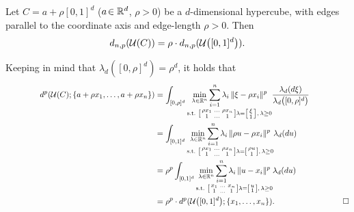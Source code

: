 \begin{prop}\label{prop:scaleProp}
Let $C= a+\rho [0,1]^d$ ($a\!\in \mathbb{R}^d$, $\rho>0$) be a $d$-dimensional hypercube, with edges parallel to the coordinate axis and edge-length $\rho > 0$. Then
\[
	d_{n,p}(\mathcal{U}(C)) = \rho \cdot d_{n,p}(\mathcal{U}\bigl([0,1]^d\bigr)).
\]
\end{prop}
 Keeping in mind that $\lambda_d([0,\rho]^d)=\rho^d$, it
holds that
\begin{eqnarray*}
\begin{split}
\hskip 1,5 cm  \dqp(\U(C); \{a+\rho x_1, \ldots, a+ \rho x_n\}) & = \int_{[0, \rho]^d} \underset{
  \text{s.t. } \left[  \begin{smallmatrix} \rho x_1 & \ldots & \rho x_n\\
          1 & \ldots & 1\\
        \end{smallmatrix}  \right] \lambda =
      \left[\begin{smallmatrix}
         \xi\\ 1\\
        \end{smallmatrix} \right],\,
      \lambda \geq 0 }{\min_{\lambda\in \R^n }\sum_{i=1}^n \lambda_i
      \,
  \norm{\xi-\rho x_i}^p}
  \frac{\lambda_d(d\xi)}{\lambda_d\bigl([0,\rho]^d\bigr)}\\ & =  \int_{[0,
  1]^d} \underset{ \text{s.t. } \left[  \begin{smallmatrix} \rho x_1 & \ldots &
  \rho x_n\\ 1 & \ldots & 1\\
        \end{smallmatrix}  \right] \lambda =
      \left[\begin{smallmatrix}
         \rho u\\ 1\\
        \end{smallmatrix} \right],\,
      \lambda \geq 0 }{\min_{\lambda\in \R^n }\sum_{i=1}^n \lambda_i
      \,
  \norm{\rho u-\rho x_i}^p} \lambda_d(du)\\
  & = \rho^p \int_{[0, 1]^d} \LP{u} \lambda_d(du)\\
  & = \rho^p \cdot \dqp(\Unifd; \{x_1, \ldots, x_n\}).\hskip 3 cm \Box
\end{split} 
\end{eqnarray*}

